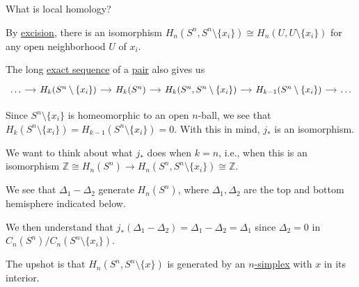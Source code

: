 \begin{problem}
What is local homology?
\end{problem}
\begin{answer}
	By \hyperref[thm:excision]{excision}, there is an isomorphism \(H_n(S^n, S^n \setminus \{x_i\}) \cong H_n(U, U \setminus \{x_i\})\) for any open
	neighborhood \(U\) of \(x_i\).

	The long \hyperref[def:exact-sequence]{exact sequence} of a \hyperref[def:good-pair]{pair} also gives us
	\[
		\begin{tikzcd}[column sep=small]
			\ldots & {H_k(S^n\setminus\{x_i\})} & {H_k(S^n)} & {H_k(S^n, S^n\setminus\{x_i\})} & {H_{k-1}(S^n\setminus\{x_i\})} & \ldots
			\arrow[from=1-1, to=1-2]
			\arrow[from=1-2, to=1-3]
			\arrow[from=1-3, to=1-4]
			\arrow[from=1-4, to=1-5]
			\arrow[from=1-5, to=1-6]
		\end{tikzcd}
	\]

	Since \(S^n \setminus \{x_i\}\) is homeomorphic to an open \(n\)-ball, we see that \(H_k(S^n \setminus \{x_i\}) = H_{k - 1}(S^n \setminus \{x_i\}) = 0\).
	With this in mind, \(j_\ast\) is an isomorphism.

	We want to think about what \(j_\ast\) does when \(k = n\), i.e., when this is an isomorphism \(\mathbb{Z}\cong H_n(S^n) \to H_n(S^n, S^n \setminus \{x_i\}) \cong \mathbb{Z}\).

	We see that \(\Delta_1 - \Delta_2\) generate \(H_n(S^n)\), where \(\Delta_1, \Delta_2\) are the top and bottom hemisphere indicated below.
	\begin{figure}[H]
		\centering
		\label{fig:les-on-relative-spheres}
	\end{figure}
	We then understand that \(j_\ast(\Delta_1 - \Delta_2) = \Delta_1 - \Delta_2 = \Delta_1\) since \(\Delta_2 = 0\) in \(C_n(S^n)/C_n(S^n \setminus \{x_i\})\).

	The upshot is that \(H_n(S^n, S^n \setminus \{x\})\) is generated by an \hyperref[def:standard-simplex]{\(n\)-simplex} with \(x\) in its interior.


\end{answer}
